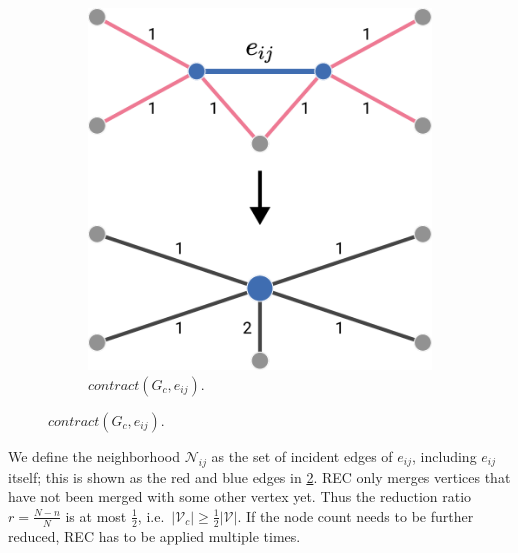 \begin{figure}[H]
\begin{minipage}{0.4\linewidth}
\begin{figure}[H]
			\includegraphics[width=0.75\linewidth]{gfx/coarse/rec.pdf}
			\caption{$\mathit{contract}(G_c, e_{i j})$.}\label{fig:coarse:rec}
		\end{figure}
	\end{minipage}
\end{figure}

We define the neighborhood $\mathcal{N}_{i j}$ as the set of incident edges of $e_{i j}$, including $e_{i j}$ itself;
this is shown as the red and blue edges in \cref{fig:coarse:rec}.
REC only merges vertices that have not been merged with some other vertex yet.
Thus the reduction ratio $r = \frac{N - n}{N}$ is at most $\frac{1}{2}$, i.e.\  $|\mathcal{V}_c| \geq \frac{1}{2} |\mathcal{V}|$.
If the node count needs to be further reduced, REC has to be applied multiple times.
